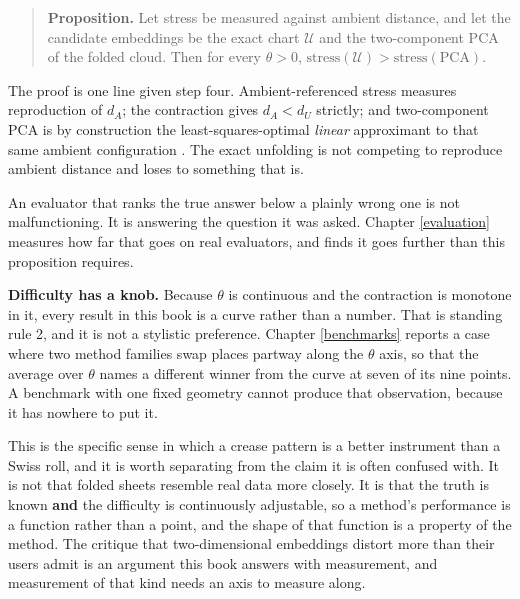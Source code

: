 \documentclass[
  british,
  a4paper,
]{book}
\begin{document}
\begin{quote}
\textbf{Proposition.} Let stress be measured against ambient distance, and let the
candidate embeddings be the exact chart \(\mathcal{U}\) and the two-component
PCA of the folded cloud. Then for every \(\theta > 0\),
\(\mathrm{stress}(\mathcal{U}) > \mathrm{stress}(\mathrm{PCA})\).
\end{quote}

The proof is one line given step four. Ambient-referenced stress measures
reproduction of \(d_A\); the contraction gives \(d_A < d_U\) strictly; and
two-component PCA is by construction the least-squares-optimal \emph{linear}
approximant to that same ambient configuration \citep{pearson1901lines, eckart1936approximation}. The exact unfolding is not competing to reproduce
ambient distance and loses to something that is.

An evaluator that ranks the true answer below a plainly wrong one is not
malfunctioning. It is answering the question it was asked. Chapter
\ref{evaluation} measures how far that goes on real evaluators, and finds it
goes further than this proposition requires.

\textbf{Difficulty has a knob.} Because \(\theta\) is continuous and the contraction is
monotone in it, every result in this book is a curve rather than a number. That
is standing rule 2, and it is not a stylistic preference. Chapter
\ref{benchmarks} reports a case where two method families swap places partway
along the \(\theta\) axis, so that the average over \(\theta\) names a different
winner from the curve at seven of its nine points. A benchmark with one fixed
geometry cannot produce that observation, because it has nowhere to put it.

This is the specific sense in which a crease pattern is a better instrument than
a Swiss roll, and it is worth separating from the claim it is often confused
with. It is not that folded sheets resemble real data more closely. It is that
the truth is known \textbf{and} the difficulty is continuously adjustable, so a
method's performance is a function rather than a point, and the shape of that
function is a property of the method. The critique that two-dimensional
embeddings distort more than their users admit \citep{chari2023specious, kobak2019art} is an argument this book answers with measurement, and
measurement of that kind needs an axis to measure along.
\end{document}
